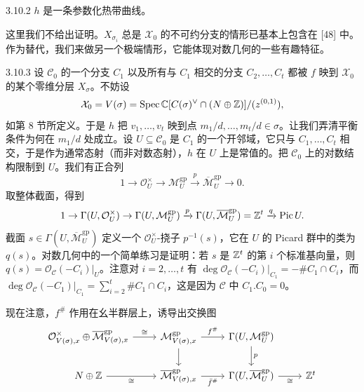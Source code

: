 \begin{proposition}{3.10.2}
$h$ 是一条参数化热带曲线。
\end{proposition}

这里我们不给出证明。$X_{\sigma_i}$ 总是 $\mathcal X_0$ 的不可约分支的情形已基本上包含在 [48] 中。作为替代，我们来做另一个极端情形，它能体现对数几何的一些有趣特征。

\begin{example}{3.10.3}
设 $\mathcal C_0$ 的一个分支 $C_1$ 以及所有与 $C_1$ 相交的分支 $C_2,\dots,C_t$ 都被 $f$ 映到 $\mathcal X_0$ 的某个零维分层 $X_\sigma$。不妨设
\[
\mathcal X_0=V(\sigma)=\operatorname{Spec}\mathbb{C}[C(\sigma)^\vee\cap(N\oplus\mathbb{Z})]/(z^{(0,1)}),
\]
如第 8 节所定义。于是 $h$ 把 $v_1,\dots,v_t$ 映到点 $m_1/d,\dots,m_t/d\in\sigma$。让我们弄清平衡条件为何在 $m_1/d$ 处成立。设 $U\subseteq\mathcal C_0$ 是 $C_1$ 的一个开邻域，它只与 $C_1,\dots,C_t$ 相交，于是作为通常态射（而非对数态射），$h$ 在 $U$ 上是常值的。把 $\mathcal C_0$ 上的对数结构限制到 $U$。我们有正合列
\[
1\to\mathcal O_U^\times\to\mathcal M_U^{\mathrm{gp}}\xrightarrow{p}\overline{\mathcal M}_U^{\mathrm{gp}}\to0.
\]
取整体截面，得到
\[
1\to\Gamma(U,\mathcal O_U^\times)\to\Gamma(U,\mathcal M_U^{\mathrm{gp}})\xrightarrow{p}\Gamma(U,\overline{\mathcal M}_U^{\mathrm{gp}})=\mathbb{Z}^t\xrightarrow{q}\operatorname{Pic}U.
\]
截面 $s\in\Gamma(U,\overline{\mathcal M}_U^{\mathrm{gp}})$ 定义一个 $\mathcal O_U^\times$-挠子 $p^{-1}(s)$，它在 $U$ 的 Picard 群中的类为 $q(s)$。对数几何中的一个简单练习是证明：若 $s$ 是 $\mathbb{Z}^t$ 的第 $i$ 个标准基向量，则 $q(s)=\mathcal O_{\mathcal C}(-C_i)|_U$。注意对 $i=2,\dots,t$ 有 $\deg\mathcal O_{\mathcal C}(-C_i)|_{C_1}=-\#C_1\cap C_i$，而 $\deg\mathcal O_{\mathcal C}(-C_1)|_{C_1}=\sum_{i=2}^t\#C_1\cap C_i$，这是因为 $\mathcal C$ 中 $C_1.C_0=0$。

现在注意，$f^\#$ 作用在幺半群层上，诱导出交换图
{\small
\[
\begin{tikzcd}
\mathcal O^\times_{V(\sigma),x}\oplus\overline{\mathcal M}^{\mathrm{gp}}_{V(\sigma),x} \arrow[r, "\cong"] & \mathcal M^{\mathrm{gp}}_{V(\sigma),x} \arrow[r, "f^\#"] \arrow[d] & \Gamma(U,\mathcal M_U^{\mathrm{gp}}) \arrow[d, "p"]\\
N\oplus\Z \arrow[r, "\cong"'] & \overline{\mathcal M}^{\mathrm{gp}}_{V(\sigma),x} \arrow[r, "\bar f^\#"'] & \Gamma(U,\overline{\mathcal M}_U^{\mathrm{gp}}) \arrow[r, "\cong"'] & \Z^t
\end{tikzcd}
\]
}
\end{example}

